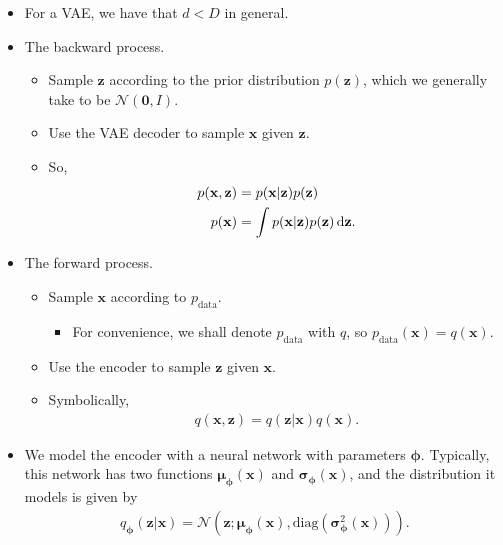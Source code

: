 \documentclass[10pt]{article}
\newcommand{\dee}{\mathrm{d}}
\newcommand{\ve}[1]{\mathbf{#1}}
\newcommand{\ves}[1]{\boldsymbol{#1}}
\newcommand{\mcal}[1]{\mathcal{#1}}
\newcommand{\diag}{\mathrm{diag}}
\newcommand{\data}{\mathrm{data}}
\begin{document}
\begin{itemize}
  \item For a VAE, we have that $d < D$ in general.
  
  \item The backward process.
  \begin{itemize}
    \item Sample $\ve{z}$ according to the prior distribution $p(\ve{z})$, which we generally take to be $\mcal{N}(\ve{0},I)$.
    
    \item Use the VAE decoder to sample $\ve{x}$ given $\ve{z}$.
    
    \item So,
    \begin{align}
      p(\ve{x}, \ve{z}) &= p(\ve{x}|\ve{z}) p(\ve{z}) \notag \\      
      p(\ve{x}) &= \int p(\ve{x}|\ve{z}) p(\ve{z})\, \dee\ve{z}. \label{eqn:vae-p-x}
    \end{align}
  \end{itemize}

  \item The forward process.
  \begin{itemize}
    \item Sample $\ve{x}$ according to $p_{\data}$.
    \begin{itemize}
      \item For convenience, we shall denote $p_{\data}$ with $q$, so $p_{\data}(\ve{x}) = q(\ve{x})$.
    \end{itemize}
    \item Use the encoder to sample $\ve{z}$ given $\ve{x}$.
    \item Symbolically,
    \begin{align*}
      q(\ve{x},\ve{z}) = q(\ve{z}|\ve{x}) q(\ve{x}).
    \end{align*}
  \end{itemize}

  \item We model the encoder with a neural network with parameters $\ves{\phi}$. Typically, this network has two functions $\ves{\mu}_{\ves{\phi}}(\ve{x})$ and $\ves{\sigma}_{\ves{\phi}}(\ve{x})$, and the distribution it models is given by
  \begin{align*}
    q_{\ves{\phi}}(\ve{z}|\ve{x}) = \mcal{N}(\ve{z}; \ves{\mu}_{\ves{\phi}}(\ve{x}), \diag(\ves{\sigma}^2_{\ves{\phi}}(\ve{x}))).
  \end{align*}


\end{itemize}
\end{document}
